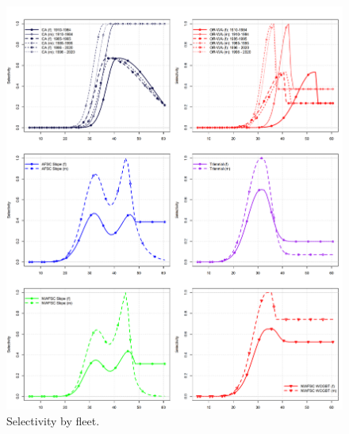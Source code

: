 \documentclass[11pt,
  english,
  a4paper,
]{article}
\begin{document}
\begin{figure}
\centering
\includegraphics[width=1\textwidth,height=1\textheight]{figs/selectivity.png}
\caption{Selectivity by fleet.\label{fig:selex}}
\end{figure}

\tagmcend\tagstructend

\end{document}
